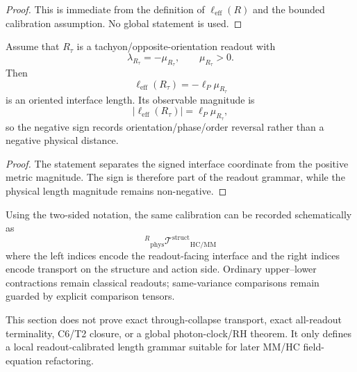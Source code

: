 \begin{proof}
This is immediate from the definition of $\ell_{\mathrm{eff}}(R)$ and the
bounded calibration assumption. No global statement is used.
\end{proof}

\begin{lemma}
Assume that $R_{\tau}$ is a tachyon/opposite-orientation readout with
\[
    \lambda_{R_{\tau}} = -\mu_{R_{\tau}},
    \qquad \mu_{R_{\tau}}>0 .
\]
Then
\[
    \ell_{\mathrm{eff}}(R_{\tau}) = -\ell_P\mu_{R_{\tau}}
\]
is an oriented interface length. Its observable magnitude is
\[
    |\ell_{\mathrm{eff}}(R_{\tau})|=\ell_P\mu_{R_{\tau}},
\]
so the negative sign records orientation/phase/order reversal rather than a
negative physical distance.
\end{lemma}

\begin{proof}
The statement separates the signed interface coordinate from the positive metric
magnitude. The sign is therefore part of the readout grammar, while the physical
length magnitude remains non-negative.
\end{proof}

\begin{remark}
Using the two-sided notation, the same calibration can be recorded schematically as
\[
    {}^{R}{}_{\mathrm{phys}}\mathcal T^{\mathrm{struct}}{}_{\mathrm{HC/MM}}
\]
where the left indices encode the readout-facing interface and the right indices
encode transport on the structure and action side. Ordinary upper--lower contractions
remain classical readouts; same-variance comparisons remain guarded by explicit
comparison tensors.
\end{remark}

\begin{remark}
This section does not prove exact through-collapse transport, exact all-readout
terminality, C6/T2 closure, or a global photon-clock/RH theorem. It only defines
a local readout-calibrated length grammar suitable for later MM/HC field-equation
refactoring.
\end{remark}
